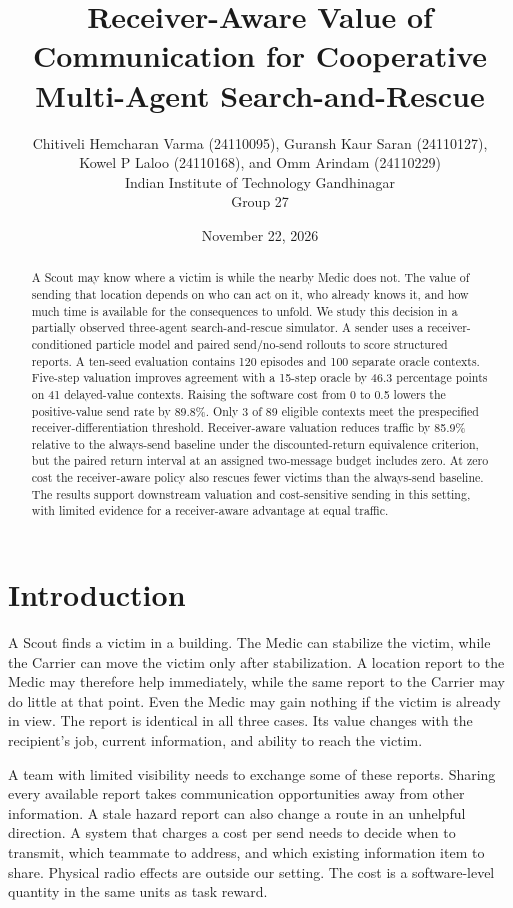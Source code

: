 \documentclass{article}
\title{Receiver-Aware Value of Communication for Cooperative Multi-Agent Search-and-Rescue}
\author{Chitiveli Hemcharan Varma (24110095), Guransh Kaur Saran (24110127),\\
Kowel P Laloo (24110168), and Omm Arindam (24110229)\\
Indian Institute of Technology Gandhinagar\\
Group 27}
\date{November 22, 2026}
\begin{document}
\maketitle
\thispagestyle{empty}

\begin{abstract}
A Scout may know where a victim is while the nearby Medic does not. The value of sending that location depends on who can act on it, who already knows it, and how much time is available for the consequences to unfold. We study this decision in a partially observed three-agent search-and-rescue simulator. A sender uses a receiver-conditioned particle model and paired send/no-send rollouts to score structured reports. A ten-seed evaluation contains 120 episodes and 100 separate oracle contexts. Five-step valuation improves agreement with a 15-step oracle by 46.3 percentage points on 41 delayed-value contexts. Raising the software cost from 0 to 0.5 lowers the positive-value send rate by 89.8\%. Only 3 of 89 eligible contexts meet the prespecified receiver-differentiation threshold. Receiver-aware valuation reduces traffic by 85.9\% relative to the always-send baseline under the discounted-return equivalence criterion, but the paired return interval at an assigned two-message budget includes zero. At zero cost the receiver-aware policy also rescues fewer victims than the always-send baseline. The results support downstream valuation and cost-sensitive sending in this setting, with limited evidence for a receiver-aware advantage at equal traffic.
\end{abstract}


\section{Introduction}

A Scout finds a victim in a building. The Medic can stabilize the victim, while the Carrier can move the victim only after stabilization. A location report to the Medic may therefore help immediately, while the same report to the Carrier may do little at that point. Even the Medic may gain nothing if the victim is already in view. The report is identical in all three cases. Its value changes with the recipient's job, current information, and ability to reach the victim.

A team with limited visibility needs to exchange some of these reports. Sharing every available report takes communication opportunities away from other information. A stale hazard report can also change a route in an unhelpful direction. A system that charges a cost per send needs to decide when to transmit, which teammate to address, and which existing information item to share. Physical radio effects are outside our setting. The cost is a software-level quantity in the same units as task reward.
\end{document}
